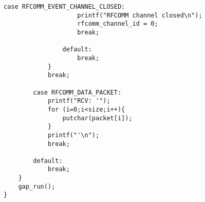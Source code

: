 \begin{lstlisting}[float, caption= SPP\&LE client - packet handler., label=code:spp_le_gap_run]
                case RFCOMM_EVENT_CHANNEL_CLOSED:
                    printf("RFCOMM channel closed\n");
                    rfcomm_channel_id = 0;
                    break;
                
                default:
                    break;
            }
            break;
                        
        case RFCOMM_DATA_PACKET:
            printf("RCV: '");
            for (i=0;i<size;i++){
                putchar(packet[i]);
            }
            printf("'\n");
            break;

        default:
            break;
    }
    gap_run();
}
\end{lstlisting}
